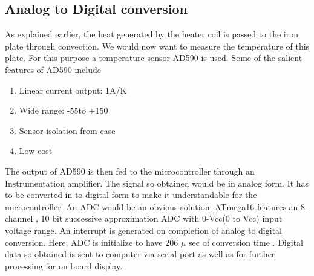 \documentclass[12pt]{report}
\begin{document}
\subsection{Analog to Digital conversion}
As explained earlier, the heat generated by the heater coil is passed to the iron plate through convection. We would now want to measure the temperature of this plate. For this purpose a temperature sensor AD590 is used.
Some of the salient features of AD590 include
\begin{enumerate}
\item Linear current output: 1\textmu A/K
\item Wide range: -55\textcelsius to +150\textcelsius
\item Sensor isolation from case
\item Low cost
\end{enumerate}
The output of AD590 is then fed to the microcontroller through an Instrumentation amplifier. The signal so obtained would be in analog form. It has to be converted in to digital form to make it understandable for the microcontroller. An ADC would be an obvious solution. ATmega16 features an 8-channel , 10 bit successive approximation ADC with 0-Vcc(0 to Vcc) input voltage range. An interrupt is generated on completion of analog to digital conversion. Here, ADC is initialize to have 206 $\mu$ sec of conversion time . Digital data so obtained is sent to computer via serial port as well as for further processing for on board display.
\end{document}
